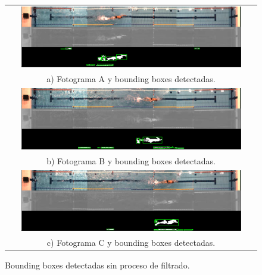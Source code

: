 \begin{figure}[h!]
    \centering
    \begin{tabular}{c}
          \includegraphics[width=0.9\textwidth,height=0.9\textheight,keepaspectratio]{imagenes/parte_BS/MUCHOS_CONTORNOS_I.png} \\
          a) Fotograma A y bounding boxes detectadas. \\
          \includegraphics[width=0.9\textwidth,height=0.9\textheight,keepaspectratio]{imagenes/parte_BS/MUCHOS_CONTORNOS_II.png} \\
          b) Fotograma B y bounding boxes detectadas.\\
          \includegraphics[width=0.9\textwidth,height=0.9\textheight,keepaspectratio]{imagenes/parte_BS/MUCHOS_CONTORNOS_III.png} \\
          c) Fotograma C y bounding boxes detectadas.\\
     \end{tabular}
     \caption{Bounding boxes detectadas sin proceso de filtrado.}
     \label{fig:muchoscontornos}
\end{figure}

